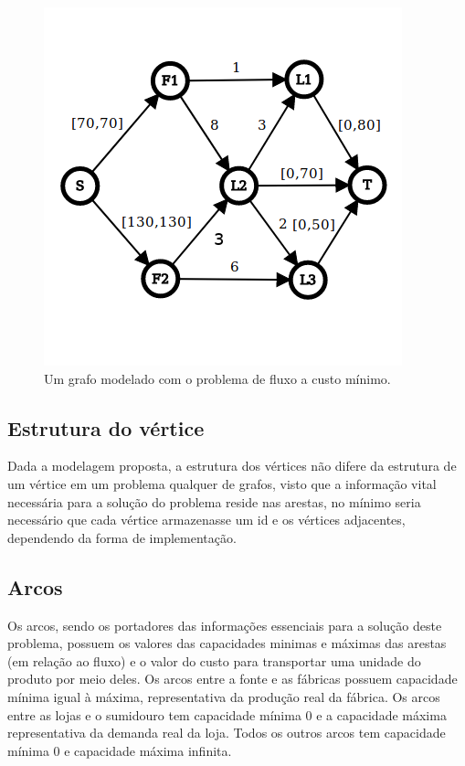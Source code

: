 \documentclass[12pt, a4]{article}
\begin{document}
\begin{figure}[H]
  \includegraphics[width=\linewidth]{grafo.png}
  \caption{Um grafo modelado com o problema de fluxo a custo mínimo.}
  \label{fig:graph}
\end{figure}

\subsection{Estrutura do vértice}
Dada a modelagem proposta, a estrutura dos vértices não difere da estrutura de
um vértice em um problema qualquer de grafos, visto que a informação vital
necessária para a solução do problema reside nas arestas, no mínimo seria
necessário que cada vértice armazenasse um id e os vértices adjacentes,
dependendo da forma de implementação.

\subsection{Arcos}
Os arcos, sendo os portadores das informações essenciais para a solução deste
problema, possuem os valores das capacidades minimas e máximas das arestas (em
relação ao fluxo) e o valor do custo para transportar uma unidade do produto por
meio deles. Os arcos entre a fonte e as fábricas possuem capacidade mínima igual
à máxima, representativa da produção real da fábrica. Os arcos entre as lojas e
o sumidouro tem capacidade mínima 0 e a capacidade máxima representativa da
demanda real da loja. Todos os outros arcos tem capacidade mínima 0 e capacidade
máxima infinita.
\end{document}
